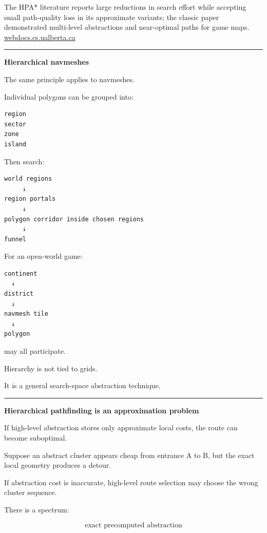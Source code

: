The HPA* literature reports large reductions in search effort while accepting small path-quality loss in its approximate variants; the classic paper demonstrated multi-level abstractions and near-optimal paths for game maps. \href{https://webdocs.cs.ualberta.ca/~mmueller/ps/2004/hpastar.pdf?utm_source=chatgpt.com}{webdocs.cs.ualberta.ca}

\begin{center}\rule{0.5\linewidth}{0.5pt}\end{center}

\textbf{Hierarchical navmeshes}

The same principle applies to navmeshes.

Individual polygons can be grouped into:

\begin{verbatim}
region
sector
zone
island
\end{verbatim}

Then search:

\begin{verbatim}
world regions
     ↓
region portals
     ↓
polygon corridor inside chosen regions
     ↓
funnel
\end{verbatim}

For an open-world game:

\begin{verbatim}
continent
  ↓
district
  ↓
navmesh tile
  ↓
polygon
\end{verbatim}

may all participate.

Hierarchy is not tied to grids.

It is a general search-space abstraction technique.

\begin{center}\rule{0.5\linewidth}{0.5pt}\end{center}

\textbf{Hierarchical pathfinding is an approximation problem}

If high-level abstraction stores only approximate local costs, the route can become suboptimal.

Suppose an abstract cluster appears cheap from entrance A to B, but the exact local geometry produces a detour.

If abstraction cost is inaccurate, high-level route selection may choose the wrong cluster sequence.

There is a spectrum:

\[
\text{exact precomputed abstraction}
\]

